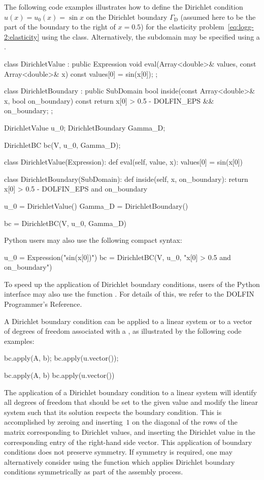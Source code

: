 The following code examples illustrates how to define the Dirichlet
condition $u(x) = u_0(x) = \sin x$ on the Dirichlet boundary
$\Gamma_{\mathrm{D}}$ (assumed here to be the part of the boundary
to the right of $x = 0.5$) for the elasticity
problem~\eqref{eq:logg-2:elasticity} using the 
class. Alternatively, the subdomain may be specified using a
.
\begin{c++}
class DirichletValue : public Expression
{
  void eval(Array<double>& values, const Array<double>& x) const
  {
    values[0] = sin(x[0]);
  }
};

class DirichletBoundary : public SubDomain
{
  bool inside(const Array<double>& x, bool on_boundary) const
  {
    return x[0] > 0.5 - DOLFIN_EPS && on_boundary;
  }
};

DirichletValue u_0;
DirichletBoundary Gamma_D;

DirichletBC bc(V, u_0, Gamma_D);
\end{c++}
\begin{python}
class DirichletValue(Expression):
    def eval(self, value, x):
        values[0] = sin(x[0])

class DirichletBoundary(SubDomain):
    def inside(self, x, on_boundary):
        return x[0] > 0.5 - DOLFIN_EPS and on_boundary

u_0 = DirichletValue()
Gamma_D = DirichletBoundary()

bc = DirichletBC(V, u_0, Gamma_D)
\end{python}
Python users may also use the following compact syntax:
\begin{python}
u_0 = Expression("sin(x[0])")
bc = DirichletBC(V, u_0, "x[0] > 0.5 and on_boundary")
\end{python}
To speed up the application of Dirichlet boundary conditions, users of the
Python interface may also use the function . For
details of this, we refer to the DOLFIN Programmer's Reference.

A Dirichlet boundary condition can be applied to a linear system or to
a vector of degrees of freedom associated with a , as
illustrated by the following code examples:
\begin{c++}
bc.apply(A, b);
bc.apply(u.vector());
\end{c++}
\begin{python}
bc.apply(A, b)
bc.apply(u.vector())
\end{python}
The application of a Dirichlet boundary condition to a linear system
will identify all degrees of freedom that should be set to the given
value and modify the linear system such that its solution respects the
boundary condition. This is accomplished by zeroing and inserting~$1$
on the diagonal of the rows of the matrix corresponding to Dirichlet
values, and inserting the Dirichlet value in the corresponding entry
of the right-hand side vector. This application of boundary conditions
does not preserve symmetry. If symmetry is required, one may
alternatively consider using the  function which
applies Dirichlet boundary conditions symmetrically as part of the
assembly process.

